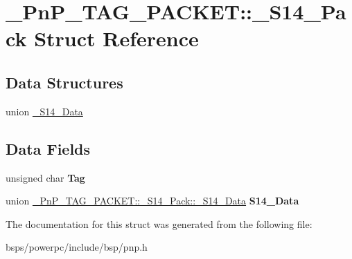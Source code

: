 \hypertarget{struct__PnP__TAG__PACKET_1_1__S14__Pack}{}\section{\+\_\+\+Pn\+P\+\_\+\+T\+A\+G\+\_\+\+P\+A\+C\+K\+ET\+::\+\_\+\+S14\+\_\+\+Pack Struct Reference}
\label{struct__PnP__TAG__PACKET_1_1__S14__Pack}
\subsection*{Data Structures}
\begin{DoxyCompactItemize}
\item 
union \mbox{\hyperlink{union__PnP__TAG__PACKET_1_1__S14__Pack_1_1__S14__Data}{\+\_\+\+S14\+\_\+\+Data}}
\end{DoxyCompactItemize}
\subsection*{Data Fields}
\begin{DoxyCompactItemize}
\item 
\mbox{\label{struct__PnP__TAG__PACKET_1_1__S14__Pack_adf4272c3d378c617e2160098c0929dd6}} 
unsigned char {\bfseries Tag}
\item 
\mbox{\label{struct__PnP__TAG__PACKET_1_1__S14__Pack_a280954304bbcce9cf2f4a18126560c4f}} 
union \mbox{\hyperlink{union__PnP__TAG__PACKET_1_1__S14__Pack_1_1__S14__Data}{\+\_\+\+Pn\+P\+\_\+\+T\+A\+G\+\_\+\+P\+A\+C\+K\+E\+T\+::\+\_\+\+S14\+\_\+\+Pack\+::\+\_\+\+S14\+\_\+\+Data}} {\bfseries S14\+\_\+\+Data}
\end{DoxyCompactItemize}


The documentation for this struct was generated from the following file\+:\begin{DoxyCompactItemize}
\item 
bsps/powerpc/include/bsp/pnp.\+h\end{DoxyCompactItemize}
